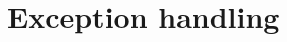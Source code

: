 \chapter{Exception handling} \label{ch:ExceptionHandaling}


\graphicspath{{Chapters/ExceptionHandaling/Figures/}}



